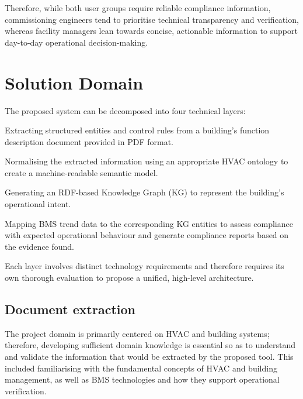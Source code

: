 \documentclass{article}
\begin{document}
Therefore, while both user groups require reliable compliance information, commissioning engineers tend to prioritise technical transparency and verification, whereas facility managers lean towards concise, actionable information to support day-to-day operational decision-making.

\section{Solution Domain}

The proposed system can be decomposed into four technical layers:

\begin{description}[style=nextline]
    \item[Document extraction] Extracting structured entities and control rules from a building's function description document provided in PDF format.
    \item[Semantic modelling] Normalising the extracted information using an appropriate HVAC ontology to create a machine-readable semantic model.
    \item[Knowledge presentation] Generating an RDF-based Knowledge Graph (KG) to represent the building's operational intent.
    \item[Compliance verification] Mapping BMS trend data to the corresponding KG entities to assess compliance with expected operational behaviour and generate compliance reports based on the evidence found.
\end{description}

Each layer involves distinct technology requirements and therefore requires its own thorough evaluation to propose a unified, high-level architecture.

\subsection{Document extraction}

The project domain is primarily centered on HVAC and building systems; therefore, developing sufficient domain knowledge is essential so as to understand and validate the information that would be extracted by the proposed tool. This included familiarising with the fundamental concepts of HVAC and building management, as well as BMS technologies and how they support operational verification. 
\end{document}
